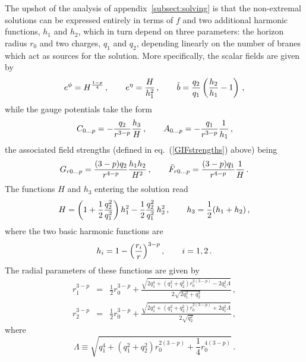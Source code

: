 \documentclass[a4paper,11pt]{article}
\newcommand{\eqref}[1]{(\ref{#1})}
\begin{document}
The upshot of the analysis of appendix~\ref{subsect:solving} is that
the non-extremal solutions can be expressed entirely in terms of $f$
and two additional harmonic functions, $h_1$ and $h_2$, which in
turn depend on three parameters: the horizon radius $r_0$ and two
charges, $q_1$ and $q_2$, depending linearly on the number of branes
which act as sources for the  solution. More specifically, the scalar
fields are given by
%
\begin{equation}
\label{scal1}
e^\phi = H^{\frac{1-p}{4}} \,,\qquad e^\eta = \frac{H}{h_1^2} \,,\qquad \tilde b
= \frac{q_2}{q_1} \left(\frac{h_2}{h_1}-1\right) \,,
\end{equation}
while the gauge potentials take the form
\begin{equation}
\label{potsols}
C_{0\ldots p} = - \frac{q_2}{r^{3-p}} \frac{h_3}{H} \,,\qquad A_{0\ldots p}
= - \frac{q_1}{r^{3-p}} \frac{1} {h_1} \,,
\end{equation}
the associated field strengths (defined in eq.~\eqref{GIFstrengths} above) 
being
\begin{equation}
\label{fstrengthsols}
G_{r0\ldots p} =  \frac{(3-p) q_2}{r^{4-p}} \frac{h_1 h_2}{H^2} \,,\qquad
\tilde{F}_{r0\ldots p} =  \frac{(3-p) q_1}{r^{4-p}} \frac{1}{H} \,.
\end{equation}
The functions $H$ and $h_3$ entering the solution read
\begin{equation}
\label{Hh3defs}
H = \left( 1 + \frac{1}{2} \frac{q_2^2}{q_1^2} \right) h_1^2 -
\frac{1}{2} \frac{q_2^2}{q_1^2}\, h_2^2 \,,\qquad h_3 = \frac{1}{2} (h_1 +
h_2) \,,
\end{equation}
where the two basic harmonic functions are
\begin{equation}
\label{accai}
h_i = 1 -\Big(\frac{r_i}{r}\Big)^{3-p} \,,\qquad i =1,2 \,.
\end{equation}
The radial parameters of these functions are given by
\begin{eqnarray}
\label{r1}
r_1^{3-p} &=& \frac{1}{2} r_0^{3-p} + \frac{\sqrt{2q_1^4 + (q_1^2 +
 q_2^2)r_0^{2(3-p)} - 2 q_1^2 \Lambda}}{2\sqrt{2q_1^2+q_2^2}}\,,
 \\[2ex]
\label{r2}
r_2^{3-p} &=& \frac{1}{2} r_0^{3-p} + \frac{\sqrt{2q_1^4 + (q_1^2 +
 q_2^2)r_0^{2(3-p)} + 2 q_1^2 \Lambda}}{2 \sqrt{q_2^2}}\,,
\end{eqnarray}
where
\begin{equation}
\label{lambda}
\Lambda \equiv \sqrt{q_1^4 + (q_1^2 +q_2^2)r_0^{2(3-p)} +
 \frac{1}{4}r_0^{4(3-p)}} \,.
\end{equation}
\end{document}
